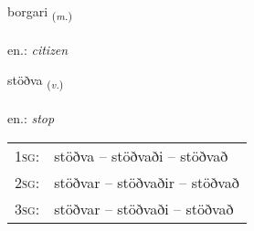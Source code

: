 \documentclass[frontgrid, backgrid]{flacards}\usepackage[]{graphicx}\usepackage[]{xcolor}
\begin{document}
\renewcommand{\blhead}{\vskip5pt {\small\bfseries\footnotesize Nafnorð | Noun }}
\renewcommand{\bcfoot}{\vskip5pt \hspace{2pt}{\small\bfseries\footnotesize 2K}}


{borgari \small{\textsubscript{(\textit{m.})}} \\[1ex] %
\textphonetic{[pɔrkarɪ]} \\
en.: \emph{citizen} \\  [2ex]
\renewcommand*{\arraystretch}{0.8}
}

\renewcommand{\flhead}{\vskip5pt \fboxsep=0pt {\small\bfseries\footnotesize Sagnorð | Verb}}
\renewcommand{\fcfoot}{\vskip5pt \fboxsep=0pt \hspace{2pt}{\small\bfseries\footnotesize 2K}}

\renewcommand{\blhead}{\vskip5pt {\small\bfseries\footnotesize Sagnorð | Verb }}
\renewcommand{\bcfoot}{\vskip5pt \hspace{2pt}{\small\bfseries\footnotesize 2K}}


{stöðva \small{\textsubscript{(\textit{v.})}} \\[1ex] %
\textphonetic{[stœðva]} \\
en.: \emph{stop} \\  [2ex]
\renewcommand*{\arraystretch}{0.8}
\begin{tabular}{p{1cm}l}
\textsc{1sg}: & stöðva -- stöðvaði -- stöðvað \\ 
\textsc{2sg}: & stöðvar -- stöðvaðir -- stöðvað \\ 
\textsc{3sg}: & stöðvar -- stöðvaði -- stöðvað \\ 
\end{tabular}
}
\end{document}

